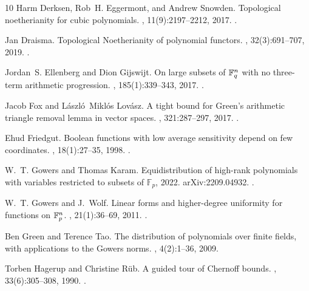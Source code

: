 \documentclass[10pt]{article}
\newcommand{\1}{\mathbf{1}}
\begin{document}
\begin{thebibliography}{10}
Harm Derksen, Rob~H. Eggermont, and Andrew Snowden.
\newblock Topological noetherianity for cubic polynomials.
, 11(9):2197--2212, 2017.
\newblock \href {https://doi.org/10.2140/ant.2017.11.2197} {}.

Jan Draisma.
\newblock Topological {N}oetherianity of polynomial functors.
, 32(3):691--707, 2019.
\newblock \href {https://doi.org/10.1090/jams/923} {}.

Jordan~S. Ellenberg and Dion Gijswijt.
\newblock On large subsets of {$\Bbb F^n_q$} with no three-term arithmetic progression.
, 185(1):339--343, 2017.
\newblock \href {https://doi.org/10.4007/annals.2017.185.1.8} {}.

Jacob Fox and L\'{a}szl\'{o}~Mikl\'{o}s Lov\'{a}sz.
\newblock A tight bound for {G}reen's arithmetic triangle removal lemma in vector spaces.
, 321:287--297, 2017.
\newblock \href {https://doi.org/10.1016/j.aim.2017.09.037} {}.

Ehud Friedgut.
\newblock Boolean functions with low average sensitivity depend on few coordinates.
, 18(1):27--35, 1998.
\newblock \href {https://doi.org/10.1007/PL00009809} {}.

W.~T. Gowers and Thomas Karam.
\newblock Equidistribution of high-rank polynomials with variables restricted to subsets of $\mathbb{F}_p$, 2022.
\newblock arXiv:2209.04932.
\newblock \href {https://doi.org/10.48550/ARXIV.2209.04932} {}.

W.~T. Gowers and J.~Wolf.
\newblock Linear forms and higher-degree uniformity for functions on {$\Bbb F^n_p$}.
, 21(1):36--69, 2011.
\newblock \href {https://doi.org/10.1007/s00039-010-0106-3} {}.

Ben Green and Terence Tao.
\newblock The distribution of polynomials over finite fields, with applications to the {G}owers norms.
, 4(2):1--36, 2009.

Torben Hagerup and Christine R{\"u}b.
\newblock A guided tour of {Chernoff} bounds.
, 33(6):305--308, 1990.
\newblock \href {https://doi.org/10.1016/0020-0190(90)90214-I} {}.


\end{thebibliography}
\end{document}
